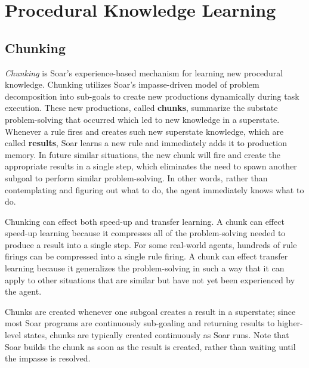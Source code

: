 \chapter{Procedural Knowledge Learning}
\label{CHUNKING}

\section{Chunking}

\textit{Chunking} is Soar's experience-based mechanism for learning new procedural knowledge.  Chunking utilizes Soar's impasse-driven model of problem decomposition into sub-goals to create new productions dynamically during task execution.  These new productions, called \textbf{chunks}, summarize the substate problem-solving that occurred which led to new knowledge in a superstate.  Whenever a rule fires and creates such new superstate knowledge, which are called \textbf{results}, Soar learns a new rule and immediately adds it to production memory.  In future similar situations, the new chunk will fire and create the appropriate results in a single step, which eliminates the need to spawn another subgoal to perform similar problem-solving.  In other words, rather than contemplating and figuring out what to do, the agent immediately knows what to do.  

Chunking can effect both speed-up and transfer learning.  A chunk can effect speed-up learning because it compresses all of the problem-solving needed to produce a result into a single step.  For some real-world agents, hundreds of rule firings can be compressed into a single rule firing.  A chunk can effect transfer learning because it generalizes the problem-solving in such a way that it can apply to other situations that are similar but have not yet been experienced by the agent.

Chunks are created whenever one subgoal creates a result in a superstate; since most Soar programs are continuously sub-goaling and returning results to higher-level states, chunks are typically created continuously as Soar runs.  Note that Soar builds the chunk as soon as the result is created, rather than waiting until the impasse is resolved.

